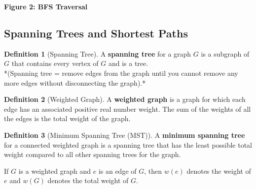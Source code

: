 \documentclass{article}
\theoremstyle{plain}
\theoremstyle{definition}
\newtheorem*{definition}{Definition}
\theoremstyle{remark}
\begin{document}
\begin{center}
\end{center}
\begin{center}
\textbf{Figure 2: BFS Traversal}
\end{center}
\vspace{1em}

\subsection{Spanning Trees and Shortest Paths}

\begin{definition}[Spanning Tree]
    A \textbf{spanning tree} for a graph $G$ is a subgraph of $G$ that contains every vertex of $G$ and is a tree. \\
    *(Spanning tree = remove edges from the graph until you cannot remove any more edges without disconnecting the graph).*
\end{definition}

\begin{definition}[Weighted Graph]
    A \textbf{weighted graph} is a graph for which each edge has an associated positive real number weight. The sum of the weights of all the edges is the total weight of the graph.
\end{definition}

\begin{definition}[Minimum Spanning Tree (MST)]
    A \textbf{minimum spanning tree} for a connected weighted graph is a spanning tree that has the least possible total weight compared to all other spanning trees for the graph. 
    
    If $G$ is a weighted graph and $e$ is an edge of $G$, then $w(e)$ denotes the weight of $e$ and $w(G)$ denotes the total weight of $G$.
\end{definition}
\end{document}
